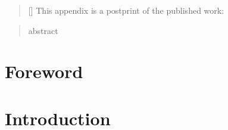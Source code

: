 

\begin{abstract}[\hspace*{-10pt}]
    This appendix is a postprint of the published work:   %
\end{abstract}

\begin{abstract}
    abstract
\end{abstract}

\minitoc



\section*{Foreword}


\section{Introduction}


